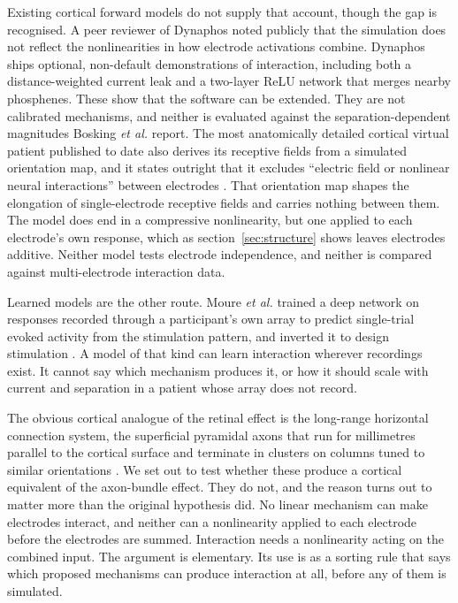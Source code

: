\documentclass[10pt,twocolumn]{article}
\begin{document}
Existing cortical forward models do not supply that account, though the
gap is recognised. A peer reviewer of Dynaphos noted publicly that the
simulation does not reflect the nonlinearities in how electrode
activations combine. Dynaphos ships optional, non-default demonstrations
of interaction, including both a distance-weighted current leak and a
two-layer ReLU network that merges nearby phosphenes. These show that the
software can be extended. They are not calibrated mechanisms, and neither
is evaluated against the separation-dependent magnitudes Bosking
\textit{et al.} report. The most anatomically detailed cortical virtual
patient published to date also derives its receptive fields from a
simulated orientation map, and it states outright that it excludes
``electric field or nonlinear neural interactions'' between electrodes
\citep{fineboynton2024}. That orientation map shapes the elongation of
single-electrode receptive fields and carries nothing between them. The
model does end in a compressive nonlinearity, but one applied to each
electrode's own response, which as section~\ref{sec:structure} shows
leaves electrodes additive. Neither model tests electrode independence,
and neither is compared against multi-electrode interaction data.

Learned models are the other route. Moure \textit{et al.} trained a deep
network on responses recorded through a participant's own array to predict
single-trial evoked activity from the stimulation pattern, and inverted it
to design stimulation \citep{moure2025}. A model of that kind can learn
interaction wherever recordings exist. It cannot say which mechanism
produces it, or how it should scale with current and separation in a
patient whose array does not record.

The obvious cortical analogue of the retinal effect is the long-range
horizontal connection system, the superficial pyramidal axons that run for
millimetres parallel to the cortical surface and terminate in clusters on
columns tuned to similar orientations \citep{gilbert1983,kandel2013}. We
set out to test whether these produce a cortical equivalent of the
axon-bundle effect. They do not, and the reason turns out to matter more
than the original hypothesis did. No linear mechanism can make electrodes
interact, and neither can a nonlinearity applied to each electrode before
the electrodes are summed. Interaction needs a nonlinearity acting on the
combined input. The argument is elementary. Its use is as a sorting rule
that says which proposed mechanisms can produce interaction at all, before
any of them is simulated.
\end{document}
